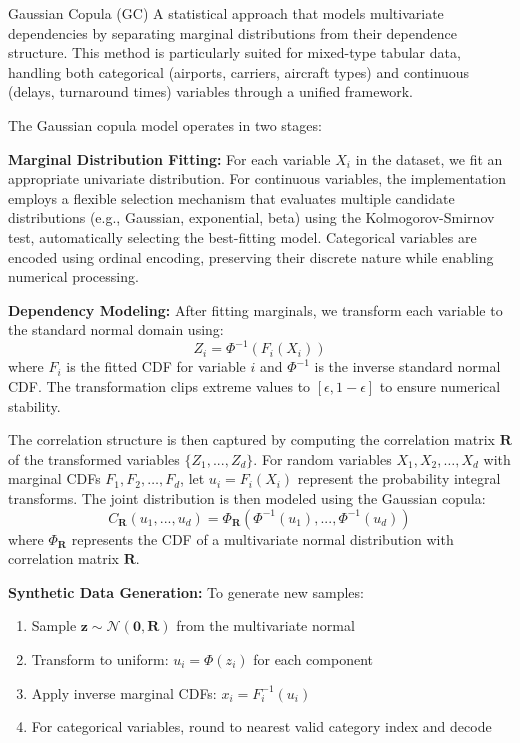 \documentclass[conference]{IEEEtran}
\begin{document}
Gaussian Copula (GC)
A statistical approach that models multivariate dependencies by separating marginal distributions from their dependence structure. This method is particularly suited for mixed-type tabular data, handling both categorical (airports, carriers, aircraft types) and continuous (delays, turnaround times) variables through a unified framework.

The Gaussian copula model operates in two stages:

\textbf{Marginal Distribution Fitting:} For each variable $X_i$ in the dataset, we fit an appropriate univariate distribution. For continuous variables, the implementation employs a flexible selection mechanism that evaluates multiple candidate distributions (e.g., Gaussian, exponential, beta) using the Kolmogorov-Smirnov test, automatically selecting the best-fitting model. Categorical variables are encoded using ordinal encoding, preserving their discrete nature while enabling numerical processing.

\textbf{Dependency Modeling:} After fitting marginals, we transform each variable to the standard normal domain using:
\begin{equation}
Z_i = \Phi^{-1}(F_i(X_i))
\end{equation}
where $F_i$ is the fitted CDF for variable $i$ and $\Phi^{-1}$ is the inverse standard normal CDF. The transformation clips extreme values to $[\epsilon, 1-\epsilon]$ to ensure numerical stability.

The correlation structure is then captured by computing the correlation matrix $\mathbf{R}$ of the transformed variables $\{Z_1, ..., Z_d\}$. For random variables $X_1, X_2, \ldots, X_d$ with marginal CDFs $F_1, F_2, \ldots, F_d$, let $u_i = F_i(X_i)$ represent the probability integral transforms. The joint distribution is then modeled using the Gaussian copula:
\begin{equation}
C_{\mathbf{R}}(u_1, ..., u_d) = \Phi_{\mathbf{R}}(\Phi^{-1}(u_1), ..., \Phi^{-1}(u_d))
\end{equation}
where $\Phi_{\mathbf{R}}$ represents the CDF of a multivariate normal distribution with correlation matrix $\mathbf{R}$.


\textbf{Synthetic Data Generation:} To generate new samples:
\begin{enumerate}
    \item Sample $\mathbf{z} \sim \mathcal{N}(\mathbf{0}, \mathbf{R})$ from the multivariate normal
    \item Transform to uniform: $u_i = \Phi(z_i)$ for each component
    \item Apply inverse marginal CDFs: $x_i = F_i^{-1}(u_i)$
    \item For categorical variables, round to nearest valid category index and decode
\end{enumerate}
\end{document}
